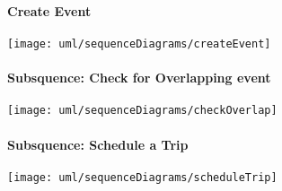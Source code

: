 \paragraph{Create Event}
	\texttt{[image: uml/sequenceDiagrams/createEvent]}
	\vfill
	
\paragraph{Subsquence: Check for Overlapping event}
	\texttt{[image: uml/sequenceDiagrams/checkOverlap]}
	\vfill
		
\paragraph{Subsquence: Schedule a Trip}	
	\texttt{[image: uml/sequenceDiagrams/scheduleTrip]}
	\vfill